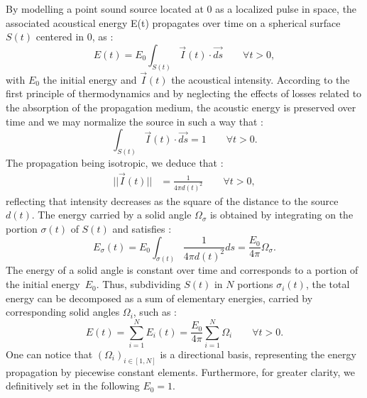 \documentclass[AMA,STIX1COL]{WileyNJD-v2}
\begin{document}
By modelling a point sound source located at 0 as a localized pulse in space, the associated acoustical energy E(t) propagates \cite{jouhaneau} over time on a spherical surface $S(t)$ centered in 0, as :
%
\begin{equation} 
E(t) = E_0 \int_{S(t)} \overrightarrow{I}(t)\cdot\overrightarrow{ds} \qquad \forall t > 0,
\end{equation}
%
with $E_0$ the initial energy and $\overrightarrow{I}(t)$ the acoustical intensity. According to the first principle of thermodynamics and by neglecting the effects of losses related to the absorption of the propagation medium, the acoustic energy is preserved over time and we may normalize the source in such a way that :
%
\begin{equation} 
\int_{S(t)} \overrightarrow{I}(t)\cdot\overrightarrow{ds} = 1 \qquad \forall t > 0.
\label{eq_2}
\end{equation}
%
The propagation being isotropic, we deduce that :
\begin{align} 
|| \overrightarrow{I}(t) || &= \frac{1}{4\pi d(t)^2} \qquad \forall t > 0,
\end{align}
%
reflecting that intensity decreases as the square of the distance to the source $d(t)$. The energy carried by a solid angle $\Omega_{\sigma}$ is obtained by integrating on the portion $\sigma(t)$ of $S(t)$ and satisfies :%
%
\begin{equation}
E_{\sigma}(t) = E_0 \int_{\sigma(t)}  \frac{1}{4\pi  d(t)^2} ds = \frac{E_0}{4\pi}  \Omega_{\sigma}.
\label{eq_4}
\end{equation}
%
The energy of a solid angle is constant over time and corresponds to a portion of the initial energy~$E_0$. Thus, subdividing $S(t)$ in $N$ portions $\sigma_i(t)$, the total energy can be decomposed as a sum of elementary energies, carried by corresponding solid angles $\Omega_i$, such as : 
%
\begin{equation}
E(t) = \sum_{i=1}^N E_i(t) = \frac{E_0}{4\pi}  \sum_{i=1}^N \Omega_i  \qquad \forall t > 0.
\label{eq_5}
\end{equation}
One can notice that $(\Omega_i)_{i\in[1,N] }$ is a directional basis, representing the energy propagation by piecewise constant elements. Furthermore, for greater clarity, we definitively set in the following $E_0 = 1$.
\end{document}
